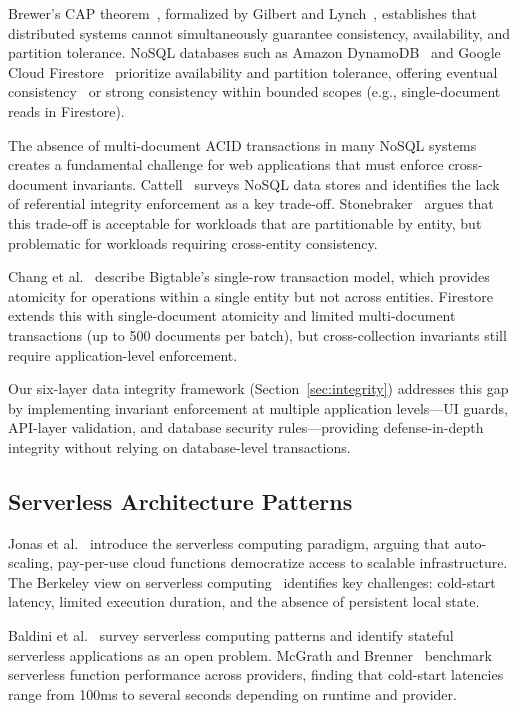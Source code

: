 \documentclass[11pt,a4paper]{article}
\theoremstyle{plain}
\theoremstyle{definition}
\begin{document}
Brewer's CAP theorem~\cite{brewer2000}, formalized by Gilbert and Lynch~\cite{gilbert2002}, establishes that distributed systems cannot simultaneously guarantee consistency, availability, and partition tolerance. NoSQL databases such as Amazon DynamoDB~\cite{decandia2007} and Google Cloud Firestore~\cite{firebase} prioritize availability and partition tolerance, offering eventual consistency~\cite{vogels2009} or strong consistency within bounded scopes (e.g., single-document reads in Firestore).

The absence of multi-document ACID transactions in many NoSQL systems creates a fundamental challenge for web applications that must enforce cross-document invariants. Cattell~\cite{cattell2010} surveys NoSQL data stores and identifies the lack of referential integrity enforcement as a key trade-off. Stonebraker~\cite{stonebraker2010} argues that this trade-off is acceptable for workloads that are partitionable by entity, but problematic for workloads requiring cross-entity consistency.

Chang et al.~\cite{chang2006} describe Bigtable's single-row transaction model, which provides atomicity for operations within a single entity but not across entities. Firestore extends this with single-document atomicity and limited multi-document transactions (up to 500 documents per batch), but cross-collection invariants still require application-level enforcement.

Our six-layer data integrity framework (Section~\ref{sec:integrity}) addresses this gap by implementing invariant enforcement at multiple application levels---UI guards, API-layer validation, and database security rules---providing defense-in-depth integrity without relying on database-level transactions.

\subsection{Serverless Architecture Patterns}

Jonas et al.~\cite{jonas2017} introduce the serverless computing paradigm, arguing that auto-scaling, pay-per-use cloud functions democratize access to scalable infrastructure. The Berkeley view on serverless computing~\cite{jonas2019} identifies key challenges: cold-start latency, limited execution duration, and the absence of persistent local state.

Baldini et al.~\cite{baldini2017} survey serverless computing patterns and identify stateful serverless applications as an open problem. McGrath and Brenner~\cite{mcgrath2017} benchmark serverless function performance across providers, finding that cold-start latencies range from 100ms to several seconds depending on runtime and provider.
\end{document}
